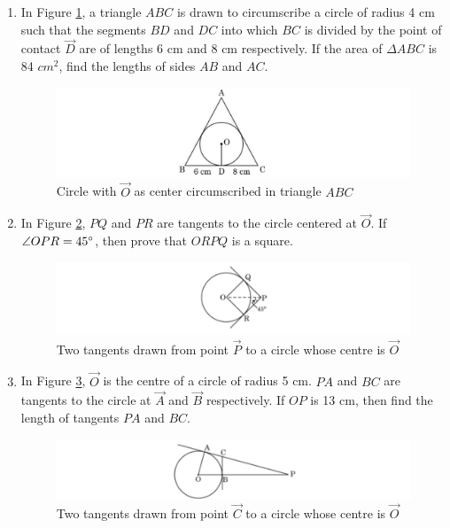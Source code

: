 \begin{enumerate}
	\item In Figure \ref{fig:tri1}, a triangle $ABC$ is drawn to circumscribe a circle of radius 4 cm such that the segments $BD$ and $DC$ into which $BC$ is divided by the point of contact $\vec{D}$ are of lengths 6 cm and 8 cm respectively. If the area of $\Delta ABC$ is 84 $cm^2$, find the lengths of sides $AB$ and $AC$.
		\begin{figure}[H]
			\centering
			\includegraphics[width=\columnwidth]{figs/tri}
				\caption{Circle with $\vec{O}$ as center circumscribed in triangle $ABC$}
				\label{fig:tri1}
		\end{figure}

	\item In Figure \ref{fig:sq1}, $PQ$ and $PR$ are tangents to the circle centered at $\vec{O}$. If $\angle OPR=45\degree$, then prove that $ORPQ$ is a square.
		\begin{figure}[H]
			\centering
			\includegraphics[width=\columnwidth]{figs/sq}
			\caption{Two tangents drawn from point $\vec{P}$ to a circle whose centre is $\vec{O}$}
			\label{fig:sq1}
		\end{figure}

	\item In Figure \ref{fig:sct1}, $\vec{O}$ is the centre of a circle of radius 5 cm. $PA$ and $BC$ are tangents to the circle at $\vec{A}$ and $\vec{B}$ respectively. If $OP$ is 13 cm, then find the length of tangents $PA$ and $BC$.
		\begin{figure}[H]
			\centering
			\includegraphics[width=\columnwidth]{figs/sct}
			\caption{Two tangents drawn from point $\vec{C}$ to a circle whose centre is $\vec{O}$}
			\label{fig:sct1}
		\end{figure}


\end{enumerate}

